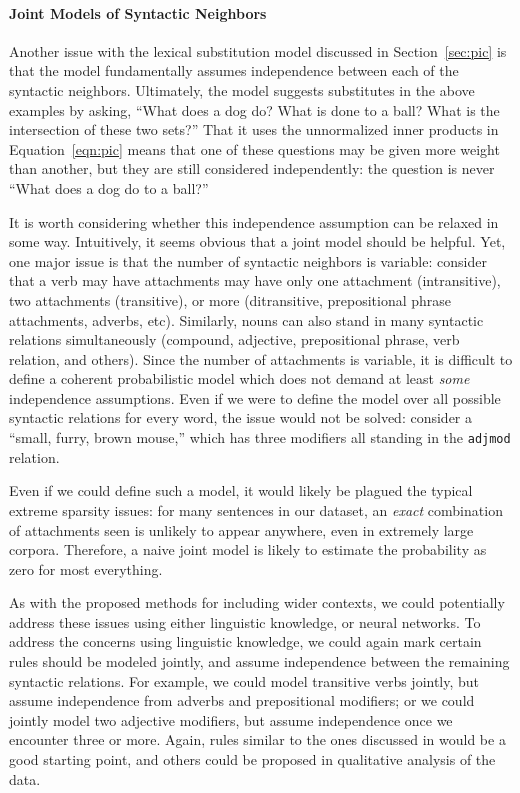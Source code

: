 \documentclass[12pt]{article}
\begin{document}
\paragraph{Joint Models of Syntactic Neighbors}

Another issue with the lexical substitution model discussed in Section~\ref{sec:pic}
is that the model fundamentally assumes independence between each of the syntactic
neighbors. Ultimately, the model suggests substitutes in the above examples by
asking, ``What does a dog do? What is done to a ball? What is the intersection
of these two sets?'' That it uses the unnormalized inner products in Equation~\ref{eqn:pic}
means that one of these questions may be given more weight than another, but they
are still considered independently: the question is never ``What does a dog do
to a ball?''

It is worth considering whether this independence assumption can be relaxed
in some way. Intuitively, it seems obvious that a joint model should be helpful.
Yet, one major issue is that the number of syntactic neighbors is variable:
consider that a verb may have attachments may have only one attachment (intransitive),
two attachments (transitive), or more (ditransitive, prepositional phrase attachments,
adverbs, etc). Similarly, nouns can also stand in many syntactic relations
simultaneously (compound, adjective, prepositional phrase, verb relation, and
others). Since the number of attachments is variable, it is difficult to define
a coherent probabilistic model which does not demand at least {\em some}
independence assumptions. Even if we were to define the model over all possible
syntactic relations for every word, the issue would not be solved: consider
a ``small, furry, brown mouse,'' which has three modifiers all standing
in the {\tt adjmod} relation.

Even if we could define such a model, it would likely be plagued the typical
extreme sparsity issues: for many sentences in our dataset, an {\em exact}
combination of attachments seen is unlikely to appear anywhere, even in
extremely large corpora. Therefore, a naive joint model is likely to estimate
the probability as zero for most everything.

As with the proposed methods for including wider contexts, we could potentially
address these issues using either linguistic knowledge, or neural networks.  To
address the concerns using linguistic knowledge, we could again mark certain
rules should be modeled jointly, and assume independence between the remaining
syntactic relations. For example, we could model transitive verbs jointly, but
assume independence from adverbs and prepositional modifiers; or we could
jointly model two adjective modifiers, but assume independence once we
encounter three or more. Again, rules similar to the ones discussed in
 would be a good starting point, and others could be
proposed in qualitative analysis of the data.
\end{document}
